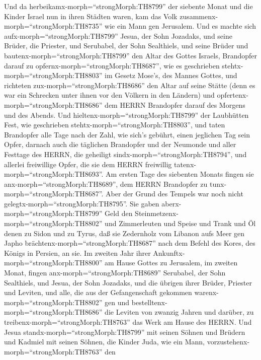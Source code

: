  Und da herbeikamx-morph=``strongMorph:TH8799'' der siebente
Monat und die Kinder Israel nun in ihren Städten waren, kam das Volk
zusammenx-morph=``strongMorph:TH8735'' wie ein Mann gen Jerusalem.
 Und es machte sich aufx-morph=``strongMorph:TH8799'' Jesua,
der Sohn Jozadaks, und seine Brüder, die Priester, und Serubabel, der
Sohn Sealthiels, und seine Brüder und
bautenx-morph=``strongMorph:TH8799'' den Altar des Gottes Israels,
Brandopfer darauf zu opfernx-morph=``strongMorph:TH8687'', wie es
geschrieben stehtx-morph=``strongMorph:TH8803'' im Gesetz Mose's, des
Mannes Gottes,  und richteten
zux-morph=``strongMorph:TH8686'' den Altar auf seine Stätte (denn es war
ein Schrecken unter ihnen vor den Völkern in den Ländern) und
opfertenx-morph=``strongMorph:TH8686'' dem HERRN Brandopfer darauf des
Morgens und des Abends.  Und
hieltenx-morph=``strongMorph:TH8799'' der Laubhütten Fest, wie
geschrieben stehtx-morph=``strongMorph:TH8803'', und taten Brandopfer
alle Tage nach der Zahl, wie sich's gebührt, einen jeglichen Tag sein
Opfer,  darnach auch die täglichen Brandopfer und der
Neumonde und aller Festtage des HERRN, die geheiligt
sindx-morph=``strongMorph:TH8794'', und allerlei freiwillige Opfer, die
sie dem HERRN freiwillig tatenx-morph=``strongMorph:TH8693''.
 Am ersten Tage des siebenten Monats fingen sie
anx-morph=``strongMorph:TH8689'', dem HERRN Brandopfer zu
tunx-morph=``strongMorph:TH8687''. Aber der Grund des Tempels war noch
nicht gelegtx-morph=``strongMorph:TH8795''.  Sie gaben
aberx-morph=``strongMorph:TH8799'' Geld den
Steinmetzenx-morph=``strongMorph:TH8802'' und Zimmerleuten und Speise
und Trank und Öl denen zu Sidon und zu Tyrus, daß sie Zedernholz vom
Libanon aufs Meer gen Japho brächtenx-morph=``strongMorph:TH8687'' nach
dem Befehl des Kores, des Königs in Persien, an sie.  Im
zweiten Jahr ihrer Ankunftx-morph=``strongMorph:TH8800'' am Hause Gottes
zu Jerusalem, im zweiten Monat, fingen anx-morph=``strongMorph:TH8689''
Serubabel, der Sohn Sealthiels, und Jesua, der Sohn Jozadaks, und die
übrigen ihrer Brüder, Priester und Leviten, und alle, die aus der
Gefangenschaft gekommen warenx-morph=``strongMorph:TH8802'' gen und
bestelltenx-morph=``strongMorph:TH8686'' die Leviten von zwanzig Jahren
und darüber, zu treibenx-morph=``strongMorph:TH8763'' das Werk am Hause
des HERRN.  Und Jesua standx-morph=``strongMorph:TH8799''
mit seinen Söhnen und Brüdern und Kadmiel mit seinen Söhnen, die Kinder
Juda, wie ein Mann, vorzustehenx-morph=``strongMorph:TH8763'' den
